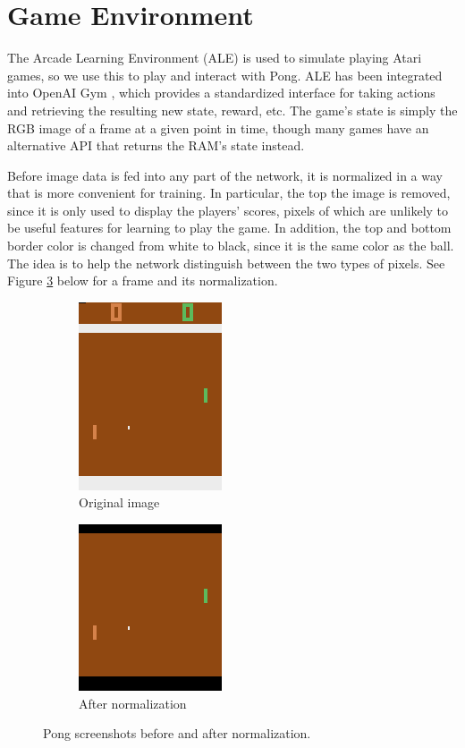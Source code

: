\documentclass[10pt, twocolumn]{article}
\begin{document}
\section{Game Environment}
The Arcade Learning Environment (ALE) is used to simulate playing Atari games, so we use this to play and interact with
Pong. ALE has been integrated into OpenAI Gym \cite{openai}, which provides a standardized interface for taking actions
and retrieving the resulting new state, reward, etc. The game's state is simply the RGB image of a frame at a given point in time,
though many games have an alternative API that returns the RAM's state instead.

Before image data is fed into any part of the network, it is normalized in a way that is more convenient for training.
In particular, the top the image is removed, since it is only used to display the players' scores, pixels of which are
unlikely to be useful features for learning to play the game. In addition, the top and bottom border color is changed from
white to black, since it is the same color as the ball. The idea is to help the network distinguish between the two types of pixels.
See Figure \ref{screenshots} below for a frame and its normalization.

\begin{figure}[h]
\centering
\begin{subfigure}[b]{.2\textwidth}
  \centering
  \includegraphics[scale=0.5]{unnormalized}
  \caption{Original image}
  \label{fig:unnormalized}
\end{subfigure} 
\begin{subfigure}[b]{.2\textwidth}
  \centering
  \includegraphics[scale=0.5]{normalized}
  \caption{After normalization}
  \label{fig:normalized}
\end{subfigure} \hfill
\caption{Pong screenshots before and after normalization.}
\label{screenshots}
\end{figure}
\end{document}
